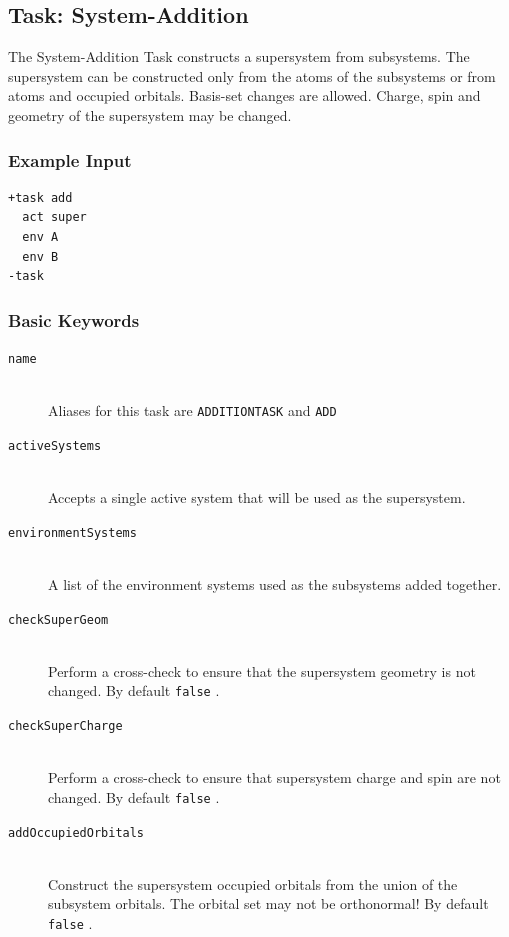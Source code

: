 \documentclass[bibliography=totocnumbered,a4paper,10pt,oneside]{scrbook}
\newcommand{\ttt}[1]{%
  \begingroup\setlength{\fboxsep}{1pt}%
  \colorbox{serenity-green!30}{\texttt{\hspace*{2pt}\vphantom{(g}#1\hspace*{2pt}}}%
  \endgroup
}
\begin{document}
\subsection{Task: System-Addition}
The System-Addition Task constructs a supersystem from subsystems. The supersystem can be constructed only from the atoms of the subsystems or from atoms and occupied orbitals. Basis-set changes are allowed. Charge, spin and geometry of the supersystem may be changed.
\subsubsection{Example Input}
\begin{lstlisting}
+task add
  act super
  env A
  env B
-task
\end{lstlisting}
\subsubsection{Basic Keywords}
\begin{description}
	\item[\texttt{name}]\hfill \\
	Aliases for this task are \ttt{ADDITIONTASK} and \ttt{ADD}
	\item[\texttt{activeSystems}]\hfill \\
	Accepts a single active system that will be used as the supersystem.
	\item[\texttt{environmentSystems}]\hfill \\
	A list of the environment systems used as the subsystems added together.
	\item[\texttt{checkSuperGeom}]\hfill \\
	Perform a cross-check to ensure that the supersystem geometry is not changed. By default \ttt{false}.
	\item[\texttt{checkSuperCharge}]\hfill \\
	Perform a cross-check to ensure that supersystem charge and spin are not changed. By default \ttt{false}.
	\item[\texttt{addOccupiedOrbitals}]\hfill \\
	Construct the supersystem occupied orbitals from the union of the subsystem orbitals. The orbital set may not be orthonormal! By default \ttt{false}.
\end{description}
\end{document}
